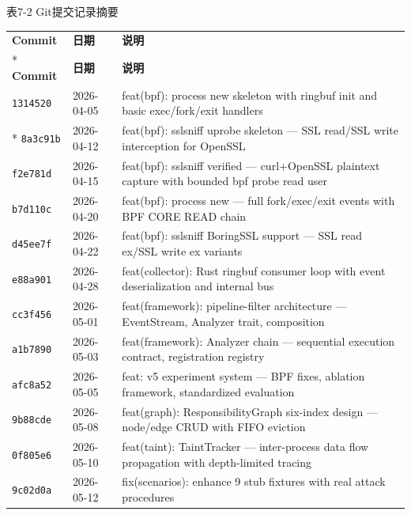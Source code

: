 \documentclass[a4paper]{ctexart}
\makeatletter
\renewcommand{\_}{%
  \ifmmode
    \nfss@text{\textunderscore}%
  \else
    \textunderscore\discretionary{}{}{}%
  \fi}
\makeatother
\begin{document}
\medskip
{\centering\small
表7-2 Git提交记录摘要\par
\vspace{3pt}
\setlength{\tabcolsep}{6pt}
\renewcommand{\arraystretch}{1.1}
\begin{longtable}{@{} p{3.3cm} p{2.0cm} p{9.7cm} @{}}
\hline
\textbf{Commit} & \textbf{日期} & \textbf{说明} \\*
\hline
\endfirsthead
\hline
\textbf{Commit} & \textbf{日期} & \textbf{说明} \\
\hline
\endhead
\hline
\endfoot
\hline
\endlastfoot
\texttt{1314520} & 2026-04-05 & feat(bpf): process\_new skeleton with ringbuf init and basic exec/fork/exit handlers \\*
\hline
\texttt{8a3c91b} & 2026-04-12 & feat(bpf): sslsniff uprobe skeleton — SSL\_read/SSL\_write interception for OpenSSL \\
\hline
\texttt{f2e781d} & 2026-04-15 & feat(bpf): sslsniff verified — curl+OpenSSL plaintext capture with bounded bpf\_probe\_read\_user \\
\hline
\texttt{b7d110c} & 2026-04-20 & feat(bpf): process\_new — full fork/exec/exit events with BPF\_CORE\_READ chain \\
\hline
\texttt{d45ee7f} & 2026-04-22 & feat(bpf): sslsniff BoringSSL support — SSL\_read\_ex/SSL\_write\_ex variants \\
\hline
\texttt{e88a901} & 2026-04-28 & feat(collector): Rust ringbuf consumer loop with event deserialization and internal bus \\
\hline
\texttt{cc3f456} & 2026-05-01 & feat(framework): pipeline-filter architecture — EventStream, Analyzer trait, composition \\
\hline
\texttt{a1b7890} & 2026-05-03 & feat(framework): Analyzer chain — sequential execution contract, registration registry \\
\hline
\texttt{afc8a52} & 2026-05-05 & feat: v5 experiment system — BPF fixes, ablation framework, standardized evaluation \\
\hline
\texttt{9b88cde} & 2026-05-08 & feat(graph): ResponsibilityGraph six-index design — node/edge CRUD with FIFO eviction \\
\hline
\texttt{0f805e6} & 2026-05-10 & feat(taint): TaintTracker — inter-process data flow propagation with depth-limited tracing \\
\hline
\texttt{9c02d0a} & 2026-05-12 & fix(scenarios): enhance 9 stub fixtures with real attack procedures \\
\hline

\end{longtable}}
\end{document}
